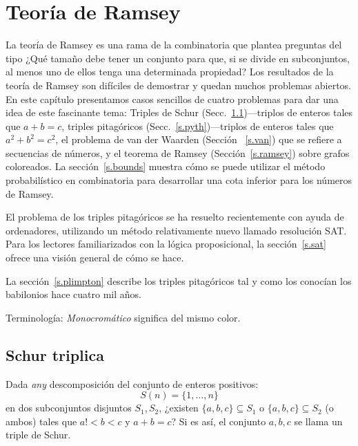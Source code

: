 
\chapter{Teoría de Ramsey}\label{c.ramsey}


La teoría de Ramsey es una rama de la combinatoria que plantea preguntas del tipo ¿Qué tamaño debe tener un conjunto para que, si se divide en subconjuntos, al menos uno de ellos tenga una determinada propiedad?
Los resultados de la teoría de Ramsey son difíciles de demostrar y quedan muchos problemas abiertos. En este capítulo presentamos casos sencillos de cuatro problemas para dar una idea de este fascinante tema: Triples de Schur (Secc.~\ref{s.schur})---triplos de enteros tales que $a+b=c$, triples pitagóricos (Secc.~\ref{s.pyth})---triplos de enteros tales que $a^2+b^2=c^2$, el problema de van der Waarden (Sección ~\ref{s.van}) que se refiere a secuencias de números, y el teorema de Ramsey (Sección~\ref{s.ramsey}) sobre grafos coloreados. La sección~\ref{s.bounds} muestra cómo se puede utilizar el método probabilístico en combinatoria para desarrollar una cota inferior para los números de Ramsey.

El problema de los triples pitagóricos se ha resuelto recientemente con ayuda de ordenadores, utilizando un método relativamente nuevo llamado resolución SAT. Para los lectores familiarizados con la lógica proposicional, la sección~\ref{s.sat} ofrece una visión general de cómo se hace.

La sección~\ref{s.plimpton} describe los triples pitagóricos tal y como los conocían los babilonios hace cuatro mil años.

Terminología: \emph{Monocromático} significa del mismo color.


\section{Schur triplica}\label{s.schur}

\begin{definition}
Dada \emph{any} descomposición del conjunto de enteros positivos:
\[
S(n)=\{1,\ldots,n\}
\]
en dos subconjuntos disjuntos $S_1,S_2$, ¿existen $\{a,b,c\}\subseteq S_1$ o $\{a,b,c\}\subseteq S_2$ (o ambos) tales que $a!<\!b\!<\!c$ y $a+b=c$? Si es así, el conjunto $ {a,b,c}$ se llama un triple de Schur.
\end{definition}

